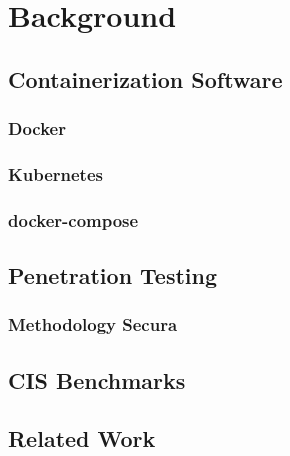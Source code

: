 \chapter{Background}

\section{Containerization Software}
\subsection{Docker}
\subsection{Kubernetes}
\subsection{docker-compose}
\section{Penetration Testing}
\subsection{Methodology Secura}
\section{CIS Benchmarks}
\section{Related Work}
